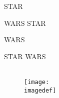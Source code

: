 \thispagestyle{empty}
{
	\vspace*{0.2\textheight}

	\ifbook
		\hfill \huge STAR\hspace{2mm}

		\vspace*{8mm}
		
		\hfill WARS
	\else
		\hfill \huge STAR\hspace{22mm}
		
		\vspace*{8mm}
		
		\hfill WARS\hspace{20mm}
	\fi
}

\cleardoublepage
\thispagestyle{empty}

\ifbook
	\vspace*{1cm}
\else
	\vspace*{5,2cm}
\fi

\begin{center}
	{\Huge STAR WARS}\\
	\vspace{2mm}
	\large{\textit{\titledef}}\\
	\vspace{3mm}
	\begin{figure}[h]
		\centering
			\texttt{[image: \\imagedef]}
	\end{figure}
	\vspace{2mm}
	\large{\authordef}\\
	\normalsize
	\yeardef\\

\end{center}

\newpage
